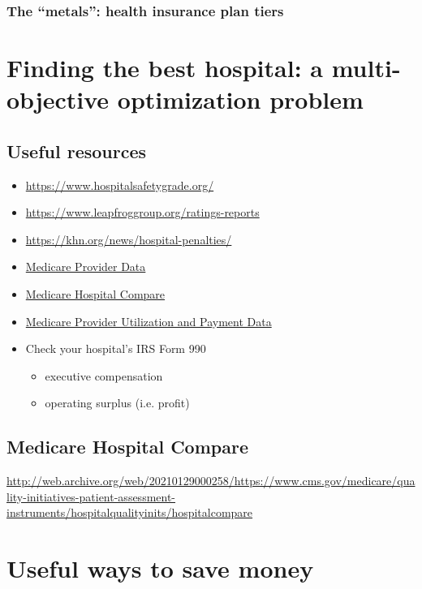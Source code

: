 \documentclass{article}
\begin{document}
\subsubsection{The ``metals'': health insurance plan tiers}

\section{Finding the best hospital: a multi-objective optimization problem}

\subsection{Useful resources}

\begin{itemize}
\item \url{https://www.hospitalsafetygrade.org/}
\item \url{https://www.leapfroggroup.org/ratings-reports}
\item \url{https://khn.org/news/hospital-penalties/}
\item \href{https://data.cms.gov/provider-data/}{Medicare Provider Data}
\item \href{https://www.medicare.gov/care-compare/}{Medicare Hospital Compare}
\item \href{https://www.cms.gov/Research-Statistics-Data-and-Systems/Statistics-Trends-and-Reports/Medicare-Provider-Charge-Data}{Medicare Provider Utilization and Payment Data}
\item Check your hospital's IRS Form 990
\begin{itemize}
  \item executive compensation
  \item operating surplus (i.e. profit)
\end{itemize}
\end{itemize}

\subsection{Medicare Hospital Compare}

\url{http://web.archive.org/web/20210129000258/https://www.cms.gov/medicare/quality-initiatives-patient-assessment-instruments/hospitalqualityinits/hospitalcompare}

\section{Useful ways to save money}

\printbibliography
\end{document}
